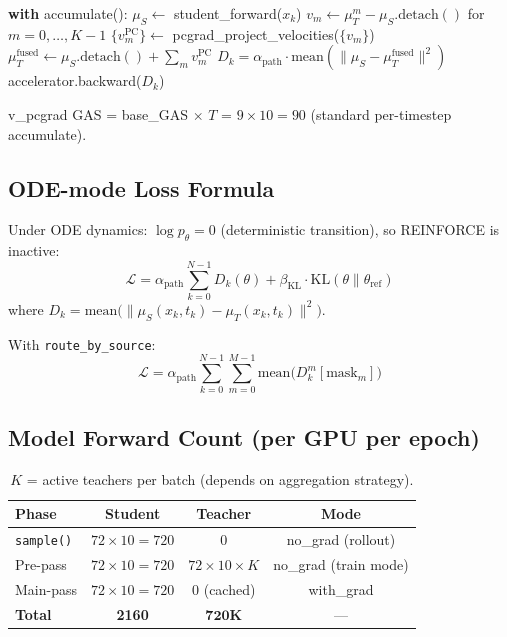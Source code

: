 \documentclass[11pt]{article}
\begin{document}
\begin{algorithm}[H]
\caption{OPD Main-pass (v\_pcgrad mode)}
\begin{algorithmic}
    \STATE \textbf{with} accumulate():
    \STATE \quad $\mu_S \leftarrow$ student\_forward($x_k$) 
    \STATE \quad $v_m \leftarrow \mu_T^m - \mu_S.\text{detach}()$ for $m = 0, \ldots, K-1$
    \STATE \quad $\{v_m^\text{PC}\} \leftarrow$ pcgrad\_project\_velocities($\{v_m\}$)
    \STATE \quad $\mu_T^\text{fused} \leftarrow \mu_S.\text{detach}() + \sum_m v_m^\text{PC}$
    \STATE \quad $D_k = \alpha_\text{path} \cdot \text{mean}(\|\mu_S - \mu_T^\text{fused}\|^2)$
    \STATE \quad accelerator.backward($D_k$) 
\ENDFOR
\end{algorithmic}
\end{algorithm}

v\_pcgrad GAS = base\_GAS $\times$ $T$ = $9 \times 10 = 90$ (standard per-timestep accumulate).

\subsection{ODE-mode Loss Formula}

Under ODE dynamics: $\log p_\theta = 0$ (deterministic transition), so REINFORCE is inactive:
\begin{equation}
\mathcal{L} = \alpha_\text{path} \sum_{k=0}^{N-1} D_k(\theta) + \beta_\text{KL} \cdot \text{KL}(\theta \| \theta_\text{ref})
\end{equation}
where $D_k = \text{mean}\bigl(\|\mu_S(x_k, t_k) - \mu_T(x_k, t_k)\|^2\bigr)$.

With \texttt{route\_by\_source}:
\begin{equation}
\mathcal{L} = \alpha_\text{path} \sum_{k=0}^{N-1} \sum_{m=0}^{M-1} \text{mean}\bigl(D_k^m[\text{mask}_m]\bigr)
\end{equation}

\subsection{Model Forward Count (per GPU per epoch)}

\begin{table}[h]
\centering
\begin{tabular}{lccc}
\toprule
Phase & Student & Teacher & Mode \\
\midrule
\texttt{sample()} & $72 \times 10 = 720$ & 0 & no\_grad (rollout) \\
Pre-pass & $72 \times 10 = 720$ & $72 \times 10 \times K$ & no\_grad (train mode) \\
Main-pass & $72 \times 10 = 720$ & 0 (cached) & with\_grad \\
\midrule
\textbf{Total} & \textbf{2160} & $\mathbf{720K}$ & --- \\
\bottomrule
\end{tabular}
\caption{$K$ = active teachers per batch (depends on aggregation strategy).}
\end{table}
\end{document}
